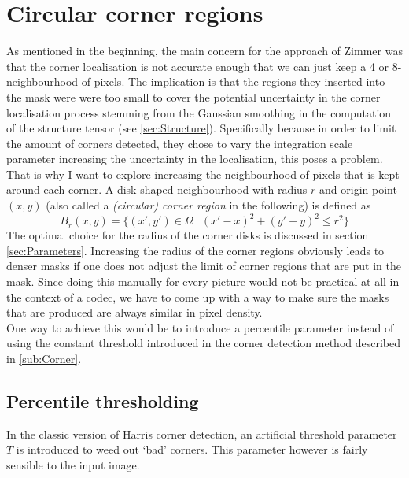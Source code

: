 \section{Circular corner regions}\label{sec:Contribution}
As mentioned in the beginning, the main concern for the approach of Zimmer\cite{zimmer07} was that the 
corner localisation is not accurate enough that we can just keep a 4 or 8-neighbourhood 
of pixels. The implication is that the regions they inserted into the mask were were too small to
cover the potential uncertainty in the corner localisation process stemming from the Gaussian
smoothing in the computation of the structure tensor (see \ref{sec:Structure}). Specifically
because in order to limit the amount of corners detected, they chose to vary the integration scale
parameter increasing the uncertainty in the localisation, this poses a problem.
That is why I want to explore increasing the neighbourhood of pixels that is kept around each
corner. A disk-shaped neighbourhood with radius $r$ and origin point $(x, y)$ (also called a
\textit{(circular) corner region} in the following) is defined as 
\begin{equation}
    B_r(x, y) = \lbrace (x',y') \in \Omega\ \vert\ (x'-x)^2 + (y'-y)^2 \leq r^2\rbrace
\end{equation}
The optimal choice for the radius of the corner disks is discussed in section \ref{sec:Parameters}.
Increasing the radius of the corner regions obviously leads to denser masks if one does not adjust
the limit of corner regions that are put in the mask. Since doing this manually for every picture
would not be practical at all in the context of a codec, we have to come up with a way to make sure
the masks that are produced are always similar in pixel density.\\
One way to achieve this would be to introduce a percentile parameter instead of using the constant
threshold introduced in the corner detection method described in \ref{sub:Corner}.

\subsection{Percentile thresholding}\label{sub:Percentile}
In the classic version of Harris corner detection, an artificial threshold parameter $T$ is
introduced to weed out `bad' corners. This parameter however is fairly sensible to the input image.

